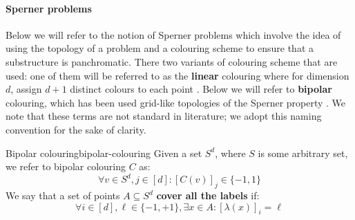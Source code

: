 %
%

\paragraph{Sperner problems}

Below we will refer to the notion of Sperner problems which involve
the idea of using the topology of a problem and a colouring scheme to ensure
that a substructure is panchromatic. There two variants of colouring scheme
that are used: one of them will be referred to as the \textbf{linear} colouring
where for dimension $d$, assign $d+1$ distinct colours to each point \cite{daskalakis_ComplexityComputingNash_2006, chen_Complexity2DDiscrete_2009}.
Below we will refer to \textbf{bipolar} colouring, which has been used grid-like topologies of the Sperner property
\cite{chen_SettlingComplexityComputing_2009, deligkas_PureCircuitTightInapproximability_2024, daskalakis_ComplexityConstrainedMinmax_2021}.
We note that these terms are not standard in literature; we adopt this naming convention
for the sake of clarity.



\begin{definitionbox}{Bipolar colouring}{bipolar-colouring}
    Given a set $S^d$, where $S$ is some arbitrary set, we refer
    to bipolar colouring $C$ as:
    $$
    \forall v \in S^d, j \in [d]: [C(v)]_j \in \{-1,1\}
    $$
    We say that a set of points $A \subseteq S^d$ \textbf{cover all the labels} if:
    $$
        \forall i \in [d], \ell \in \{-1, +1\}, \exists x \in A: [\lambda(x)]_{i} = \ell
    $$

\end{definitionbox}

